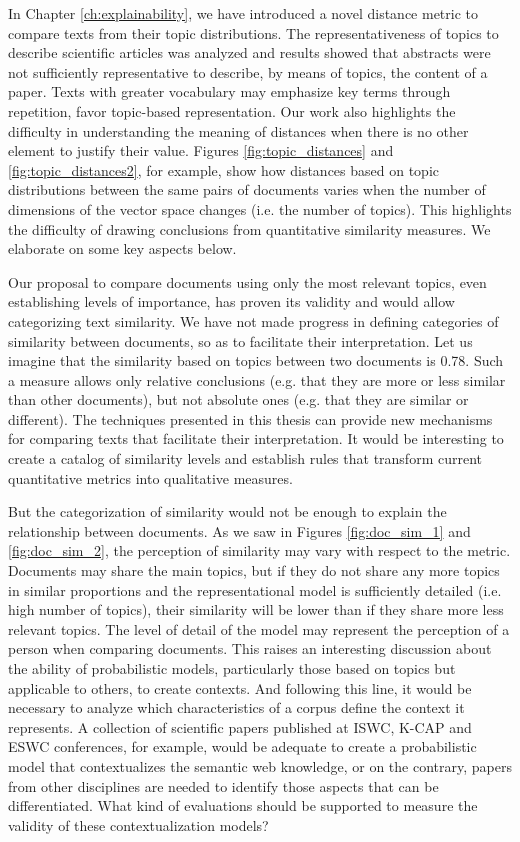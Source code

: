 In Chapter \ref{ch:explainability}, we have introduced a novel distance metric to compare texts from their topic distributions. The representativeness of topics to describe scientific articles was analyzed and results showed that abstracts were not sufficiently representative to describe, by means of topics, the content of a paper. Texts with greater vocabulary may emphasize key terms through repetition, favor topic-based representation. Our work also highlights the difficulty in understanding the meaning of distances when there is no other element to justify their value. Figures \ref{fig:topic_distances} and \ref{fig:topic_distances2}, for example, show how distances based on topic distributions between the same pairs of documents varies when the number of dimensions of the vector space changes (i.e. the number of topics). This highlights the difficulty of drawing conclusions from quantitative similarity measures. We elaborate on some key aspects below.

Our proposal to compare documents using only the most relevant topics, even establishing levels of importance, has proven its validity and would allow categorizing text similarity. We have not made progress in defining categories of similarity between documents, so as to facilitate their interpretation. Let us imagine that the similarity based on topics between two documents is 0.78. Such a measure allows only relative conclusions (e.g. that they are more or less similar than other documents), but not absolute ones (e.g. that they are similar or different). The techniques presented in this thesis can provide new mechanisms for comparing texts that facilitate their interpretation. It would be interesting to create a catalog of similarity levels and establish rules that transform current quantitative metrics into qualitative measures.
  
  
But the categorization of similarity would not be enough to explain the relationship between documents. As we saw in Figures \ref{fig:doc_sim_1} and \ref{fig:doc_sim_2}, the perception of similarity may vary with respect to the metric. Documents may share the main topics, but if they do not share any more topics in similar proportions and the representational model is sufficiently detailed (i.e. high number of topics), their similarity will be lower than if they share more less relevant topics. The level of detail of the model may represent the perception of a person when comparing documents. This raises an interesting discussion about the ability of probabilistic models, particularly those based on topics but applicable to others, to create contexts. And following this line, it would be necessary to analyze which characteristics of a corpus define the context it represents. A collection of scientific papers published at ISWC, K-CAP and ESWC conferences, for example, would be adequate to create a probabilistic model that contextualizes the semantic web knowledge, or on the contrary, papers from other disciplines are needed to identify those aspects that can be differentiated. What kind of evaluations should be supported to measure the validity of these contextualization models?

